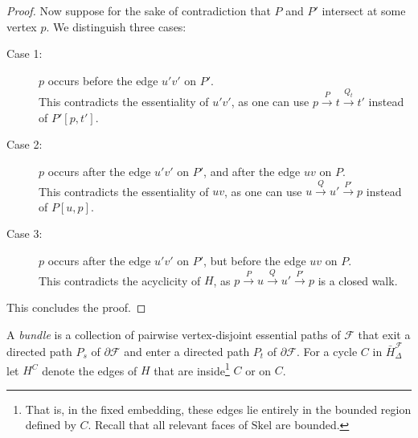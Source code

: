 \documentclass[a4paper,11pt]{article}
\newcommand{\bd}{\partial}
\newcommand{\calF}{\mathcal{F}}
\newcommand{\Skel}{\mathrm{Skel}}
\theoremstyle{plain}
\newtheorem{identification rule}{Identification Rule}
\theoremstyle{definition}
\theoremstyle{remark}
\begin{document}
\begin{proof}
Now suppose for the sake of contradiction that $P$ and $P'$ intersect at some vertex $p$. We distinguish three cases:
\begin{description}
\item[Case 1:] $p$ occurs before the edge $u'v'$ on $P'$.\\
This contradicts the essentiality of $u'v'$, as one can use $p \xrightarrow{P} t \xrightarrow{Q_t} t'$ instead of $P'[p,t']$.
\item[Case 2:] $p$ occurs after the edge $u'v'$ on $P'$, and after the edge $uv$ on $P$.\\
This contradicts the essentiality of $uv$, as one can use $u \xrightarrow{Q} u' \xrightarrow{P'} p$ instead of $P[u,p]$.
\item[Case 3:] $p$ occurs after the edge $u'v'$ on $P'$, but before the edge $uv$ on $P$.\\
This contradicts the acyclicity of $H$, as $p \xrightarrow{P} u \xrightarrow{Q} u' \xrightarrow{P'} p$ is a closed walk.
\end{description}

This concludes the proof.
\end{proof}

A \emph{bundle} is a collection of pairwise vertex-disjoint essential paths of $\calF$ that exit a directed path $P_s$ of $\bd \calF$ and enter a directed path $P_t$ of $\bd\calF$. For a cycle $C$ in $\bar{H}^\calF_\Delta$ let $H^C$ denote the edges of $H$ that are inside\footnote{That is, in the fixed embedding, these edges lie entirely in the bounded region defined by $C$. Recall that all relevant faces of $\Skel$ are bounded.} $C$ or on $C$.
\end{document}
